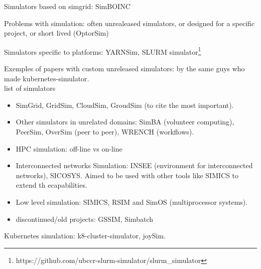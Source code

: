 Simulators based on simgrid: SimBOINC \cite{kondo2007simboinc}

Problems with simulation: often unrealeased simulators, or designed for a
specific project, or short lived (OptorSim)

Simulators specific to platforms: YARNSim, SLURM simulator\footnote{https://github.com/ubccr-slurm-simulator/slurm\_simulator} 

Exemples of papers with custom unreleased simulators: \cite{yabuuchi2019lowlatency} by the same guys who made kubernetes-simulator.\\

list of simulators
\begin{itemize}
	\item SimGrid, GridSim, CloudSim, GroudSim (to cite the most important).
	\item Other simulators in unrelated domains: SimBA (volunteer computing), PeerSim, OverSim (peer to peer), WRENCH (workflows).
	\item HPC simulation: off-line vs on-line
	\item Interconnected networks Simulation: INSEE (environment for interconnected networks), SICOSYS. Aimed to be used with other tools like SIMICS to extend th ecapabilities.
	\item Low level simulation: SIMICS, RSIM and SimOS (multiprocessor systems).
	\item discontinued/old projects: GSSIM, Simbatch
\end{itemize}

Kubernetes simulation: k8-cluster-simulator, joySim.
